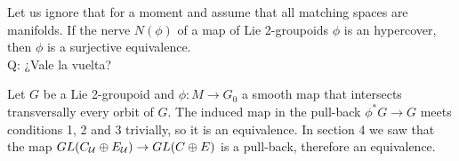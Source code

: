 Let us ignore that for a moment and assume that all matching spaces are manifolds.
If the nerve $N(\phi)$ of a map of Lie 2-groupoids $\phi$ is an hypercover, then $\phi$ is a surjective equivalence.\\
Q: ¿Vale la vuelta?

\medskip

Let $G$ be a Lie 2-groupoid and $\phi: M\to G_0$ a smooth map that intersects transversally every orbit of $G$.
The induced map in the pull-back $\phi^*G \to G$ meets conditions 1, 2 and 3 trivially, so it is an equivalence.
In section 4 we saw that the map $GL(C_{\mathcal{U}}\oplus E_{\mathcal{U}}) \to GL(C\oplus E)$ is a pull-back, therefore an equivalence.

